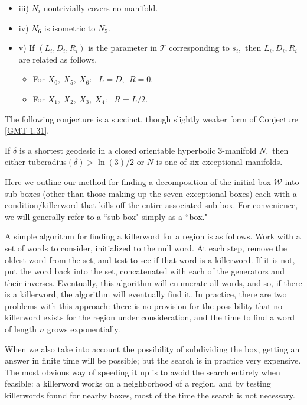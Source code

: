 \begin{remark}
\begin{conjecture}
\begin{itemize}
\item{iii)} $N_i$ nontrivially covers no manifold.  

\item{iv)} $N_6$ is isometric to $N_5.$
 
\item{v)} If $(L_i, D_i, R_i)$ is the parameter in ${\mathcal T}$
corresponding to $s_i,$ then $L_i, D_i, R_i$ are related as follows.
\begin{itemize}
\item[] For $X_0,\ X_5,\ X_6:\ \ \ L=D, \ \ R=0.$  

\item[] For $X_1,\ X_2,\ X_3,\ X_4:\ \ \ R=L/2.$
\end{itemize}
\end{itemize}
\end{conjecture}

The following conjecture is a succinct, though slightly weaker
form of Conjecture \ref{GMT 1.31}.

\begin{conjecture}\label{GMT 1.33}
  If $\delta$ is a shortest geodesic in a closed
orientable hyperbolic $3$\/{\textrm -}\/manifold $N,$ then either 
tuberadius$(\delta) > \ln(3)/2$
or $N$ is one of six exceptional manifolds.
\end{conjecture}

\begin{remark}\label{GMT1.34}
Here we outline our method for finding a decomposition of the initial box ${\mathcal W}$ into sub-boxes (other than those making up the
 seven exceptional boxes)
each with a condition/killerword that kills off the entire associated sub-box.
For convenience, we will generally refer to a ``sub-box" simply as a ``box."

A simple algorithm for finding a killerword for a region is as follows.
Work with a set of words to consider, initialized to the null word.  At 
each step, remove the oldest word from the set, and test to see if that 
word is a killerword.
If it is not, put the word back into the set, concatenated with each of 
the generators and their inverses.
Eventually, this algorithm will enumerate all words, and so, if there 
is a killerword, the algorithm will eventually find it.  In practice, 
there are two problems with this approach: there is no provision for the possibility that no killerword exists for the region under consideration, 
and the time to find a word of length $n$ grows exponentially.

When we also take into account the possibility of subdividing the box, getting an answer in finite time will be possible; but the search is in practice 
very expensive.  The most obvious way of speeding it up is to avoid 
the search entirely when feasible: a killerword works on a neighborhood of a 
region, and by testing killerwords found for nearby boxes, most of 
the time the search is not necessary.


\end{remark}
\end{remark}
